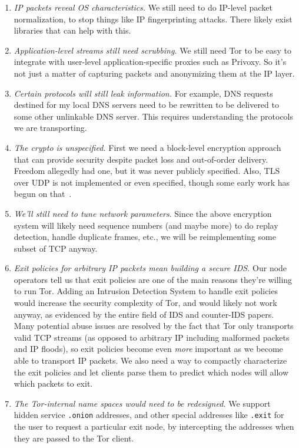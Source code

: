 \documentclass{llncs}
\begin{document}
\begin{enumerate}
\setlength{\itemsep}{0mm}
\setlength{\parsep}{0mm}
\item \emph{IP packets reveal OS characteristics.} We still need to do
IP-level packet normalization, to stop things like IP fingerprinting
attacks. There likely exist libraries that can help with this.
\item \emph{Application-level streams still need scrubbing.} We still need
Tor to be easy to integrate with user-level application-specific proxies
such as Privoxy. So it's not just a matter of capturing packets and
anonymizing them at the IP layer.
\item \emph{Certain protocols will still leak information.} For example,
DNS requests destined for my local DNS servers need to be rewritten
to be delivered to some other unlinkable DNS server. This requires
understanding the protocols we are transporting.
\item \emph{The crypto is unspecified.} First we need a block-level encryption
approach that can provide security despite
packet loss and out-of-order delivery. Freedom allegedly had one, but it was
never publicly specified.
Also, TLS over UDP is not implemented or even
specified, though some early work has begun on that~\cite{dtls}.
\item \emph{We'll still need to tune network parameters}. Since the above
encryption system will likely need sequence numbers (and maybe more) to do
replay detection, handle duplicate frames, etc., we will be reimplementing
some subset of TCP anyway.
\item \emph{Exit policies for arbitrary IP packets mean building a secure
IDS\@.}  Our node operators tell us that exit policies are one of
the main reasons they're willing to run Tor.
Adding an Intrusion Detection System to handle exit policies would
increase the security complexity of Tor, and would likely not work anyway,
as evidenced by the entire field of IDS and counter-IDS papers. Many
potential abuse issues are resolved by the fact that Tor only transports
valid TCP streams (as opposed to arbitrary IP including malformed packets
and IP floods), so exit policies become even \emph{more} important as
we become able to transport IP packets. We also need a way to compactly
characterize the exit policies and let clients parse them to predict
which nodes will allow which packets to exit.
\item \emph{The Tor-internal name spaces would need to be redesigned.} We
support hidden service {\tt{.onion}} addresses, and other special addresses
like {\tt{.exit}} for the user to request a particular exit node,
by intercepting the addresses when they are passed to the Tor client.
\end{enumerate}
\end{document}
